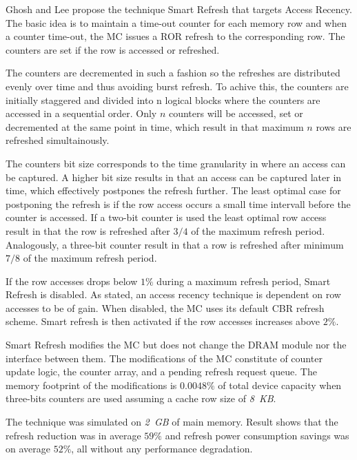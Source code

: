 Ghosh and Lee propose the technique Smart Refresh \cite{smartrefresh} that targets Access Recency. The basic idea is to maintain a time-out counter for each memory row and when a counter time-out, the MC issues a ROR refresh to the corresponding row. The counters are set if the row is accessed or refreshed.

The counters are decremented in such a fashion so the refreshes are distributed evenly over time and thus avoiding burst refresh. To achive this, the counters are initially staggered and divided into n logical blocks where the counters are accessed in a sequential order. Only $n$ counters will be accessed, set or decremented at the same point in time, which result in that maximum $n$ rows are refreshed simultainously. 

The counters bit size corresponds to the time granularity in where an access can be captured. A higher bit size results in that an access can be captured later in time, which effectively postpones the refresh further. The least optimal case for postponing the refresh is if the row access occurs a small time intervall before the counter is accessed. If a two-bit counter is used the least optimal row access result in that the row is refreshed after $3/4$ of the maximum refresh period. Analogously, a three-bit counter result in that a row is refreshed after minimum $7/8$ of the maximum refresh period.

If the row accesses drops below $1\%$ during a maximum refresh period, Smart Refresh is disabled. As stated, an access recency technique is dependent on row accesses to be of gain. When disabled, the MC uses its default CBR refresh scheme. Smart refresh is then activated if the row accesses increases above $2\%$.

Smart Refresh modifies the MC but does not change the DRAM module nor the interface between them. The modifications of the MC constitute of counter update logic, the counter array, and a pending refresh request queue. The memory footprint of the modifications is $0.0048\%$ of total device capacity when three-bits counters are used assuming a cache row size of \textit{8~KB}.

The technique was simulated on \textit{2~GB} of main memory. Result shows that the refresh reduction was in average $59\%$ and refresh power consumption savings was on average $52\%$, all without any performance degradation.